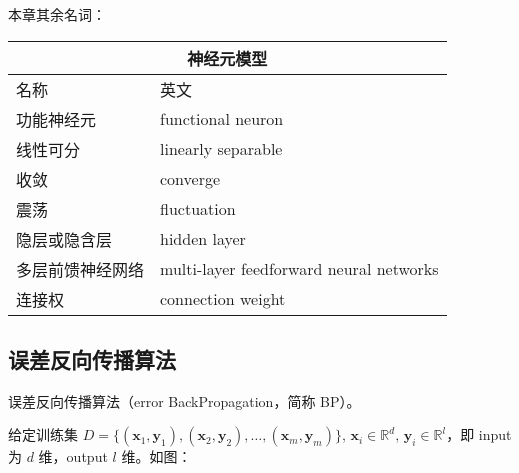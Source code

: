 \documentclass[../studies-ml.tex]{subfiles}
\begin{document}
本章其余名词：

\begin{center}
  \begin{tabular}{ |p{4cm}||p{7cm}|  }
    \hline
    \multicolumn{2}{|c|}{\textbf{神经元模型}}               \\
    \hline
    名称       & 英文                                      \\
    \hline
    功能神经元    & functional neuron                       \\
    \hline
    线性可分     & linearly separable                      \\
    \hline
    收敛       & converge                                \\
    \hline
    震荡       & fluctuation                             \\
    \hline
    隐层或隐含层   & hidden layer                            \\
    \hline
    多层前馈神经网络 & multi-layer feedforward neural networks \\
    \hline
    连接权      & connection weight                       \\
    \hline
  \end{tabular}
\end{center}

\newpage

\subsection{误差反向传播算法}

误差反向传播算法（error BackPropagation，简称 BP）。

给定训练集 $D = \{(\pmb{x}_1, \pmb{y}_1), (\pmb{x}_2, \pmb{y}_2),\dots,(\pmb{x}_m, \pmb{y}_m)\},\,
  \pmb{x}_i \in \mathbb{R}^d,\, \pmb{y}_i \in \mathbb{R}^l$，即 input 为 $d$ 维，output $l$ 维。如图：
\end{document}
